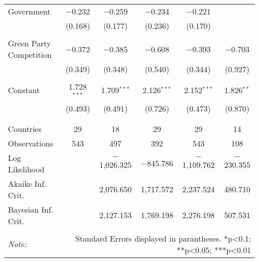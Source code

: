\begin{tabular}{@{\extracolsep{5pt}}lccccc}
 Government & $-$0.232 & $-$0.259 & $-$0.234 & $-$0.221 &  \\ 
  & (0.168) & (0.177) & (0.236) & (0.170) &  \\ 
  & & & & & \\ 
 Green Party Competition & $-$0.372 & $-$0.385 & $-$0.608 & $-$0.393 & $-$0.703 \\ 
  & (0.349) & (0.348) & (0.540) & (0.344) & (0.927) \\ 
  & & & & & \\ 
 Constant & 1.728$^{***}$ & 1.709$^{***}$ & 2.126$^{***}$ & 2.152$^{***}$ & 1.826$^{**}$ \\ 
  & (0.493) & (0.491) & (0.726) & (0.473) & (0.870) \\ 
  & & & & & \\ 
\hline \\[-1.8ex] 
Countries & 29 & 18 & 29 & 29 & 14 \\ 
Observations & 543 & 497 & 392 & 543 & 108 \\ 
Log Likelihood &  & $-$1,026.325 & $-$845.786 & $-$1,109.762 & $-$230.355 \\ 
Akaike Inf. Crit. &  & 2,076.650 & 1,717.572 & 2,237.524 & 480.710 \\ 
Bayesian Inf. Crit. &  & 2,127.153 & 1,769.198 & 2,276.198 & 507.531 \\ 
\hline 
\hline \\[-1.8ex] 
\textit{Note:}  & \multicolumn{5}{r}{Standard Errors displayed in parantheses. *p<0.1; **p<0.05; ***p<0.01} \\ 
\end{tabular} 
